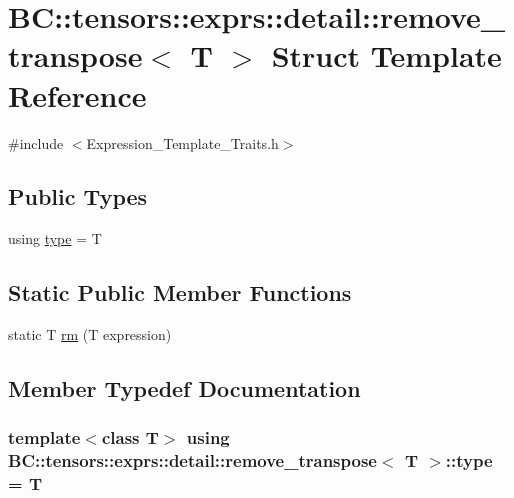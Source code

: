 \hypertarget{structBC_1_1tensors_1_1exprs_1_1detail_1_1remove__transpose}{}\section{BC\+:\+:tensors\+:\+:exprs\+:\+:detail\+:\+:remove\+\_\+transpose$<$ T $>$ Struct Template Reference}
\label{structBC_1_1tensors_1_1exprs_1_1detail_1_1remove__transpose}


{\ttfamily \#include $<$Expression\+\_\+\+Template\+\_\+\+Traits.\+h$>$}

\subsection*{Public Types}
\begin{DoxyCompactItemize}
\item 
using \hyperlink{structBC_1_1tensors_1_1exprs_1_1detail_1_1remove__transpose_a95af809840aec931e7a30aa979282162}{type} = T
\end{DoxyCompactItemize}
\subsection*{Static Public Member Functions}
\begin{DoxyCompactItemize}
\item 
static T \hyperlink{structBC_1_1tensors_1_1exprs_1_1detail_1_1remove__transpose_a4d093738cd0786d42747a46ceb28cd0b}{rm} (T expression)
\end{DoxyCompactItemize}


\subsection{Member Typedef Documentation}
\subsubsection[{\texorpdfstring{type}{type}}]{\setlength{\rightskip}{0pt plus 5cm}template$<$class T$>$ using {\bf B\+C\+::tensors\+::exprs\+::detail\+::remove\+\_\+transpose}$<$ T $>$\+::{\bf type} =  T}\hypertarget{structBC_1_1tensors_1_1exprs_1_1detail_1_1remove__transpose_a95af809840aec931e7a30aa979282162}{}\label{structBC_1_1tensors_1_1exprs_1_1detail_1_1remove__transpose_a95af809840aec931e7a30aa979282162}



